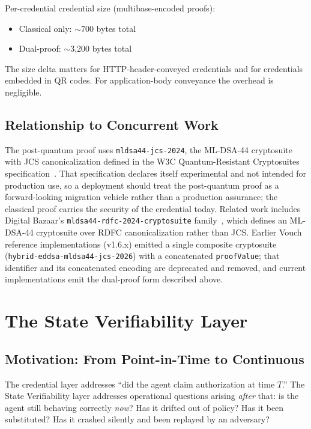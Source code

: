 \documentclass[11pt,a4paper]{article}
\begin{document}
Per-credential credential size (multibase-encoded proofs):

\begin{itemize}[leftmargin=*]
\item Classical only: $\sim$700 bytes total
\item Dual-proof: $\sim$3{,}200 bytes total
\end{itemize}

The size delta matters for HTTP-header-conveyed credentials and for credentials embedded in QR codes. For application-body conveyance the overhead is negligible.

\subsection{Relationship to Concurrent Work}

The post-quantum proof uses \texttt{mldsa44-jcs-2024}, the ML-DSA-44 cryptosuite with JCS canonicalization defined in the W3C Quantum-Resistant Cryptosuites specification~\cite{w3cqr}. That specification declares itself experimental and not intended for production use, so a deployment should treat the post-quantum proof as a forward-looking migration vehicle rather than a production assurance; the classical proof carries the security of the credential today. Related work includes Digital Bazaar's \texttt{mldsa44-rdfc-2024-cryptosuite} family~\cite{db-mldsa44}, which defines an ML-DSA-44 cryptosuite over RDFC canonicalization rather than JCS. Earlier Vouch reference implementations (v1.6.x) emitted a single composite cryptosuite (\texttt{hybrid-eddsa-mldsa44-jcs-2026}) with a concatenated \verb|proofValue|; that identifier and its concatenated encoding are deprecated and removed, and current implementations emit the dual-proof form described above.

\section{The State Verifiability Layer}
\label{sec:state}

\subsection{Motivation: From Point-in-Time to Continuous}

The credential layer addresses ``did the agent claim authorization at time $T$.'' The State Verifiability layer addresses operational questions arising \emph{after} that: is the agent still behaving correctly \emph{now}? Has it drifted out of policy? Has it been substituted? Has it crashed silently and been replayed by an adversary?
\end{document}

